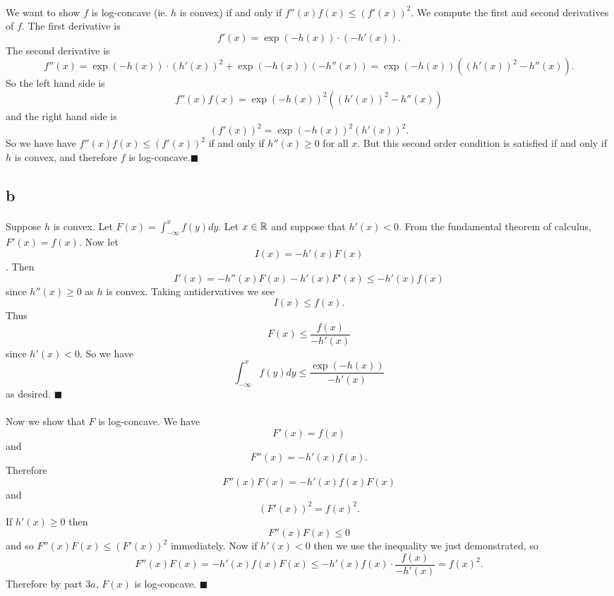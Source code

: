 \documentclass[letterpaper,12pt,oneside,onecolumn]{article}
\begin{document}
\paragraph{}
We want to show $f$ is log-concave (ie. $h$ is convex) if and only if $f''(x)f(x) \leq (f'(x))^2$. We compute the first and second derivatives of $f$. The first derivative is
$$f'(x) = \exp(-h(x))\cdot (-h'(x)).$$
The second derivative is 
$$f''(x) = \exp(-h(x)) \cdot (h'(x))^2 + \exp(-h(x))(-h''(x)) = \exp(-h(x))((h'(x))^2 - h''(x)).$$
So the left hand side is
$$f''(x)f(x) = \exp(-h(x))^2((h'(x))^2 - h''(x))$$
and the right hand side is
$$(f'(x))^2 = \exp(-h(x))^2(h'(x))^2.$$
So we have have $f''(x)f(x) \leq (f'(x))^2$ if and only if $h''(x) \geq 0$ for all $x$. But this second order condition is satisfied if and only if $h$ is convex, and therefore $f$ is log-concave.$\blacksquare$
\subsection{b}
\paragraph{}
Suppose $h$ is convex. Let $F(x) = \int_{-\infty}^x f(y) dy$. Let $x \in \mathbb{R}$ and suppose that $h'(x) < 0$. From the fundamental theorem of calculus, $F'(x) = f(x)$. Now let 
$$I(x) = -h'(x)F(x)$$.
Then $$I'(x) = -h''(x)F(x) -h'(x)F'(x) \leq -h'(x)f(x)$$
since $h''(x) \geq 0$ as $h$ is convex. Taking antidervatives we see
$$I(x) \leq f(x).$$
Thus
$$F(x) \leq \frac{f(x)}{-h'(x)}$$
since $h'(x) < 0$. So we have
$$\int_{-\infty}^xf(y)dy \leq \frac{\exp(-h(x))}{-h'(x)}$$
as desired. $\blacksquare$
\paragraph{}
Now we show that $F$ is log-concave. We have
$$F'(x) = f(x)$$
and
$$F''(x) = -h'(x)f(x).$$
Therefore
$$F''(x)F(x) = -h'(x)f(x) F(x)$$
and
$$(F'(x))^2 = f(x)^2.$$
If $h'(x) \geq 0$ then 
$$F''(x) F(x) \leq 0$$
and so $F''(x)F(x) \leq (F'(x))^2$ immediately. Now if $h'(x) < 0$ then we use the inequality we just demonstrated, so
$$F''(x) F(x) = -h'(x)f(x)F(x) \leq -h'(x)f(x) \cdot \frac{f(x)}{-h'(x)} = f(x)^2.$$
Therefore by part $3a$, $F(x)$ is log-concave. $\blacksquare$
\end{document}
